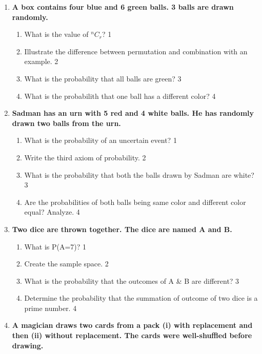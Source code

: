 \documentclass[a4paper,oneside, margin=1.4in]{book}
\begin{document}
\begin{enumerate}
 \item
	  \textbf{A box contains four blue and 6 green balls. 3 balls are drawn randomly.} 
  
  \begin{enumerate}
    \item
	What is the value of $^nC_r$? \hfill 1
    \item
	Illustrate the difference between permutation and combination with an example. \hfill 2
    \item  
	What is the probability that all balls are green? \hfill 3
    \item
	What is the probabilith that one ball has a different color? \hfill 4
  \end{enumerate}

\item
	  \textbf{Sadman has an urn with 5 red and 4 white balls. He has randomly drawn two balls from the urn.} 
  
  \begin{enumerate}
    \item
	What is the probability of an uncertain event? \hfill 1
    \item
	Write the third axiom of probability. \hfill 2
    \item  
	What is the probability that both the balls drawn by Sadman are white? \hfill 3
    \item
	Are the probabilities of both balls being same color and different color equal? Analyze. \hfill 4
  \end{enumerate}

 \item
	  \textbf{Two dice are thrown together. The dice are named A and B.} 
  
  \begin{enumerate}
    \item
	What is P(A=7)? \hfill 1
    \item
	Create the sample space. \hfill 2
    \item  
	What is the probability that the outcomes of A \& B are different? \hfill 3
    \item
	Determine the probability that the summation of outcome of two dice is a prime number. \hfill 4
  \end{enumerate}

 \item
	  \textbf{A magician draws two cards from a pack (i) with replacement and then (ii) without replacement. The cards were well-shuffled before drawing.} 
  

\end{enumerate}
\end{document}
